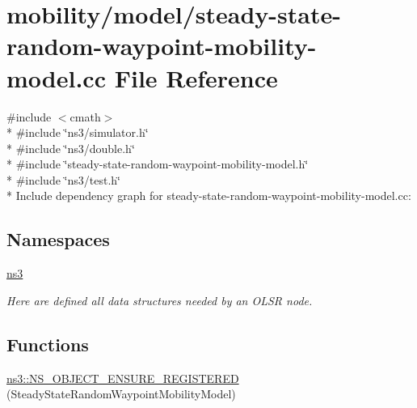 \hypertarget{steady-state-random-waypoint-mobility-model_8cc}{}\section{mobility/model/steady-\/state-\/random-\/waypoint-\/mobility-\/model.cc File Reference}
\label{steady-state-random-waypoint-mobility-model_8cc}
{\ttfamily \#include $<$cmath$>$}\\*
{\ttfamily \#include \char`\"{}ns3/simulator.\+h\char`\"{}}\\*
{\ttfamily \#include \char`\"{}ns3/double.\+h\char`\"{}}\\*
{\ttfamily \#include \char`\"{}steady-\/state-\/random-\/waypoint-\/mobility-\/model.\+h\char`\"{}}\\*
{\ttfamily \#include \char`\"{}ns3/test.\+h\char`\"{}}\\*
Include dependency graph for steady-\/state-\/random-\/waypoint-\/mobility-\/model.cc\+:
\subsection*{Namespaces}
\begin{DoxyCompactItemize}
\item 
 \hyperlink{namespacens3}{ns3}
\begin{DoxyCompactList}\small\item\em Here are defined all data structures needed by an O\+L\+SR node. \end{DoxyCompactList}\end{DoxyCompactItemize}
\subsection*{Functions}
\begin{DoxyCompactItemize}
\item 
\hyperlink{namespacens3_ad8e0de5f48c42e7523083e0dd6af1637}{ns3\+::\+N\+S\+\_\+\+O\+B\+J\+E\+C\+T\+\_\+\+E\+N\+S\+U\+R\+E\+\_\+\+R\+E\+G\+I\+S\+T\+E\+R\+ED} (Steady\+State\+Random\+Waypoint\+Mobility\+Model)
\end{DoxyCompactItemize}
